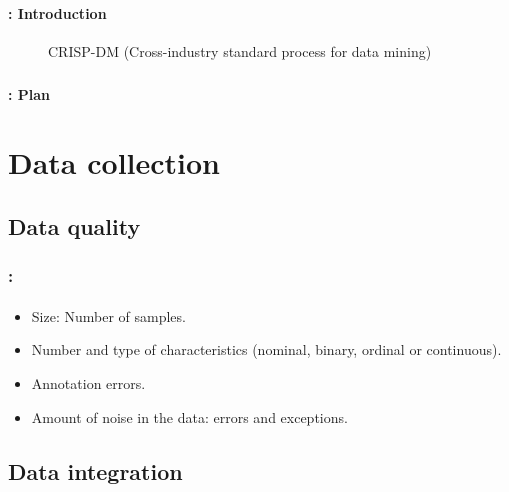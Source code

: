 \documentclass[xcolor=table]{beamer}
\subtitle[Data \& eval]{Data preparation and models' evaluation}
\begin{document}
	
\begin{frame}
	\frametitle{\inserttitle}
	\framesubtitle{\insertshortsubtitle: Introduction}
	
	\begin{figure}
		\centering
		\caption{CRISP-DM (Cross-industry standard process for data mining)}
	\end{figure}
	
\end{frame}


\begin{frame}
	\frametitle{\inserttitle}
	\framesubtitle{\insertshortsubtitle: Plan}
	
	\begin{multicols}{2}
		\tableofcontents
	\end{multicols}
\end{frame}

\section{Data collection}

\begin{frame}
	\frametitle{\insertshortsubtitle}
	\framesubtitle{\insertsection}
	
	
\end{frame}

\subsection{Data quality}

\begin{frame}
	\frametitle{\insertshortsubtitle: \insertsection}
	\framesubtitle{\insertsubsection}
	
	\begin{itemize}
		\item Size: Number of samples.
		\item Number and type of characteristics (nominal, binary, ordinal or continuous).
		\item Annotation errors.
		\item Amount of noise in the data: errors and exceptions.
	\end{itemize}

\end{frame}


\subsection{Data integration}
\end{document}
